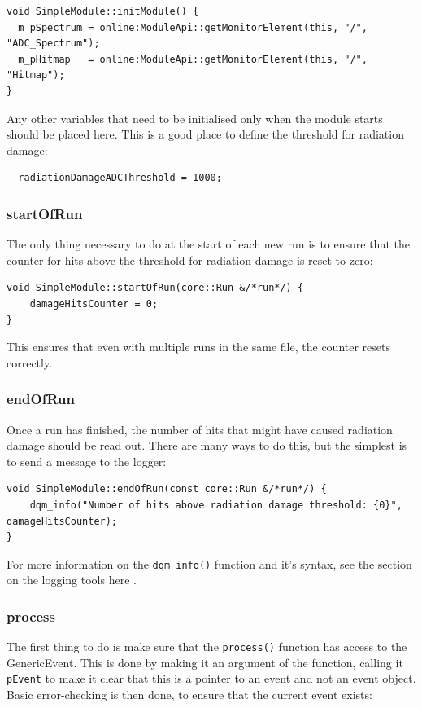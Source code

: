 \begin{lstlisting}
void SimpleModule::initModule() {
  m_pSpectrum = online:ModuleApi::getMonitorElement(this, "/", "ADC_Spectrum");
  m_pHitmap   = online:ModuleApi::getMonitorElement(this, "/", "Hitmap");
}
\end{lstlisting}

Any other variables that need to be initialised only when the module starts should be placed here. This is a good place to define the threshold for radiation damage:

\begin{lstlisting}
  radiationDamageADCThreshold = 1000;
\end{lstlisting}

\subsubsection{startOfRun}
The only thing necessary to do at the start of each new run is to ensure that the counter for hits above the threshold for radiation damage is reset to zero:

\begin{lstlisting}
void SimpleModule::startOfRun(core::Run &/*run*/) {
    damageHitsCounter = 0;
}
\end{lstlisting}

This ensures that even with multiple runs in the same file, the counter resets correctly.

\subsubsection{endOfRun}
Once a run has finished, the number of hits that might have caused radiation damage should be read out. There are many ways to do this, but the simplest is to send a message to the logger:

\begin{lstlisting}
void SimpleModule::endOfRun(const core::Run &/*run*/) {
    dqm_info("Number of hits above radiation damage threshold: {0}", damageHitsCounter);
}
\end{lstlisting}

For more information on the \texttt{dqm \textunderscore info()} function and it's syntax, see the section on the logging tools here  .

\subsubsection{process}
The first thing to do is make sure that the \texttt{process()} function has access to the GenericEvent. This is done by making it an argument of the function, calling it \texttt{pEvent} to make it clear that this is a pointer to an event and not an event object. Basic error-checking is then done, to ensure that the current event exists:

